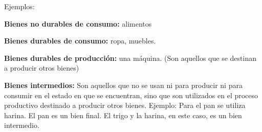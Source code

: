 Ejemplos:

\textbf{Bienes no durables de consumo:}
alimentos

\textbf{Bienes durables de consumo:}
ropa, muebles.

\textbf{Bienes durables de producción:} 
una máquina.
(Son aquellos que se destinan a producir otros bienes)

\textbf{Bienes intermedios:}
Son aquellos que no se usan ni para producir ni para consumir
en el estado en que se encuentran,
sino que son utilizados en el proceso productivo
destinado a producir otros bienes.
Ejemplo:
Para el pan se utiliza harina.
El pan es un bien final.
El trigo y la harina,
en este caso,
es un bien intermedio.
